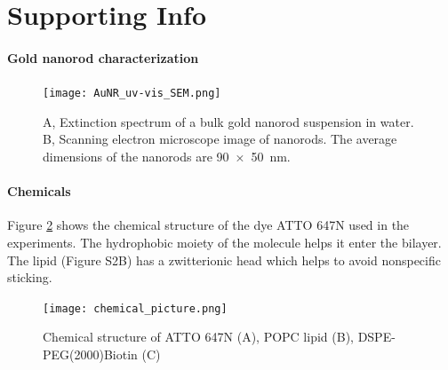 \graphicspath{{chapters/c2_bilayer_efcs/si-figure/}}

\section{Supporting Info}
\paragraph*{Gold nanorod characterization}
\begin{figure}%
  \centering
  \texttt{[image: AuNR\_uv-vis\_SEM.png]}
  \makeatletter
  \renewcommand{\fnum@figure}{\figurename~S\thefigure}
  \makeatother
  \caption{A, Extinction spectrum of a bulk gold nanorod suspension in water. B, Scanning electron microscope image of nanorods.
  The average dimensions of the nanorods are \SI[product-units=repeat]{90x50}{\nm}.}
  \label{SIfig: AuNR_uv-vis}
\end{figure}

\paragraph*{Chemicals}
Figure \ref{SIfig:chemical} shows the chemical structure of the dye ATTO 647N used in the experiments.
The hydrophobic moiety of the molecule helps it enter the bilayer.
The lipid (Figure S2B) has a zwitterionic head which helps to avoid nonspecific sticking.
\begin{figure}%
  \centering
  \texttt{[image: chemical\_picture.png]}
  \makeatletter
  \renewcommand{\fnum@figure}{\figurename~S\thefigure}
  \makeatother{}
  \caption{Chemical structure of ATTO 647N (A), POPC lipid (B), DSPE-PEG(2000)Biotin (C)}
  \label{SIfig:chemical}
\end{figure}

